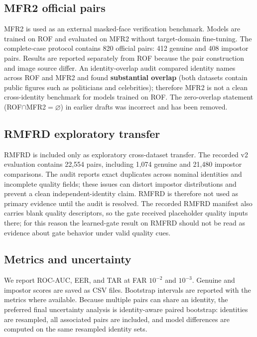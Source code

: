 ﻿\documentclass[10pt,journal,compsoc]{IEEEtran}
\begin{document}
\subsection{MFR2 official pairs}
MFR2 is used as an external masked-face verification benchmark. Models are trained on ROF and evaluated on MFR2 without target-domain fine-tuning. The complete-case protocol contains 820 official pairs: 412 genuine and 408 impostor pairs. Results are reported separately from ROF because the pair construction and image source differ. An identity-overlap audit compared identity names across ROF and MFR2 and found \textbf{substantial overlap} (both datasets contain public figures such as politicians and celebrities); therefore MFR2 is not a clean cross-identity benchmark for models trained on ROF. The zero-overlap statement (ROF$\cap$MFR2$=\varnothing$) in earlier drafts was incorrect and has been removed.

\subsection{RMFRD exploratory transfer}
RMFRD is included only as exploratory cross-dataset transfer. The recorded v2 evaluation contains 22,554 pairs, including 1,074 genuine and 21,480 impostor comparisons. The audit reports exact duplicates across nominal identities and incomplete quality fields; these issues can distort impostor distributions and prevent a clean independent-identity claim. RMFRD is therefore not used as primary evidence until the audit is resolved. The recorded RMFRD manifest also carries blank quality descriptors, so the gate received placeholder quality inputs there; for this reason the learned-gate result on RMFRD should not be read as evidence about gate behavior under valid quality cues.

\subsection{Metrics and uncertainty}
We report ROC-AUC, EER, and TAR at FAR $10^{-2}$ and $10^{-3}$. Genuine and impostor scores are saved as CSV files. Bootstrap intervals are reported with the metrics where available. Because multiple pairs can share an identity, the preferred final uncertainty analysis is identity-aware paired bootstrap: identities are resampled, all associated pairs are included, and model differences are computed on the same resampled identity sets.
\end{document}
